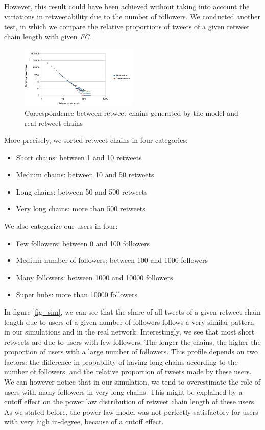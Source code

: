 \documentclass[conference]{IEEEtran}
\begin{document}
However, this result could have been achieved without taking into account the variations in retweetability due to the number of followers. We conducted another test, in which we compare the relative proportions of tweets of a given retweet chain length with given \emph{FC}.

  \begin{figure}[h]
\includegraphics[width=0.5\textwidth]{data/validationModel.jpg}
\caption{Correspondence between retweet chains generated by the model and real retweet chains}

    \label{fig:evolutionAlpha}
\end{figure}

More precisely, we sorted retweet chains in four categories:
\begin{itemize}
	\item Short chains: between 1 and 10 retweets
	\item Medium chains: between 10 and 50 retweets
	\item Long chains: between 50 and 500 retweets
	\item Very long chains: more than 500 retweets
\end{itemize}

We also categorize our users in four:
\begin{itemize}
	\item Few followers: between 0 and 100 followers
	\item Medium number of followers: between 100 and 1000 followers
	\item Many followers: between 1000 and 10000 followers
	\item Super hubs: more than 10000 followers
\end{itemize}

In figure \ref{fig_sim}, we can see that the share of all tweets of a given retweet chain length due to users of a given number of followers follows a very similar pattern in our simulations and in the real network. Interestingly, we see that most short retweets are due to users with few followers. The longer the chains, the higher the proportion of users with a large number of followers. This profile depends on two factors: the difference in probability of having long chains according to the number of followers, and the relative proportion of tweets made by these users. We can however notice that in our simulation, we tend to overestimate the role of users with many followers in very long chains. This might be explained by a cutoff effect on the power law distribution of retweet chain length of these users. As we stated before, the power law model was not perfectly satisfactory for users with very high in-degree, because of a cutoff effect.
\end{document}
